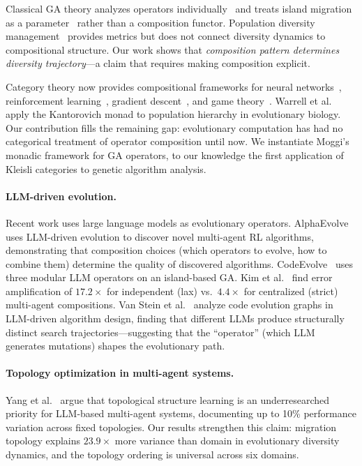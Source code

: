 \documentclass[dvipsnames,format=sigconf,anonymous=true,review=true]{acmart}
\begin{document}
Classical GA theory analyzes operators individually~\cite{holland1975adaptation, goldberg1989genetic, mitchell1992royal} and treats island migration as a parameter~\cite{whitley1999island, skolicki2005influence} rather than a composition functor. Population diversity management~\cite{burke2004diversity, crepinsek2013exploration} provides metrics but does not connect diversity dynamics to compositional structure. Our work shows that \emph{composition pattern determines diversity trajectory}---a claim that requires making composition explicit.

Category theory now provides compositional frameworks for neural networks~\cite{gavranovic2024categorical}, reinforcement learning~\cite{bakirtzis2024compositional, hedges2024reinforcement}, gradient descent~\cite{hanks2024gradient}, and game theory~\cite{ghani2025approximate}. Warrell et al.~\cite{warrell2024kantorovich} apply the Kantorovich monad to population hierarchy in evolutionary biology. Our contribution fills the remaining gap: evolutionary computation has had no categorical treatment of operator composition until now. We instantiate Moggi's~\cite{moggi1991notions} monadic framework for GA operators, to our knowledge the first application of Kleisli categories to genetic algorithm analysis.

\paragraph{LLM-driven evolution.}
Recent work uses large language models as evolutionary operators. AlphaEvolve~\cite{alphaevolve2026marl} uses LLM-driven evolution to discover novel multi-agent RL algorithms, demonstrating that composition choices (which operators to evolve, how to combine them) determine the quality of discovered algorithms. CodeEvolve~\cite{assumpcao2025codeevolve} uses three modular LLM operators on an island-based GA. Kim et al.~\cite{kim2025scaling} find error amplification of $17.2\times$ for independent (lax) vs.\ $4.4\times$ for centralized (strict) multi-agent compositions. Van Stein et al.~\cite{vanstein2025code} analyze code evolution graphs in LLM-driven algorithm design, finding that different LLMs produce structurally distinct search trajectories---suggesting that the ``operator'' (which LLM generates mutations) shapes the evolutionary path.

\paragraph{Topology optimization in multi-agent systems.}
Yang et al.~\cite{yang2025topology} argue that topological structure learning is an underresearched priority for LLM-based multi-agent systems, documenting up to 10\% performance variation across fixed topologies. Our results strengthen this claim: migration topology explains $23.9\times$ more variance than domain in evolutionary diversity dynamics, and the topology ordering is universal across six domains.
\end{document}
